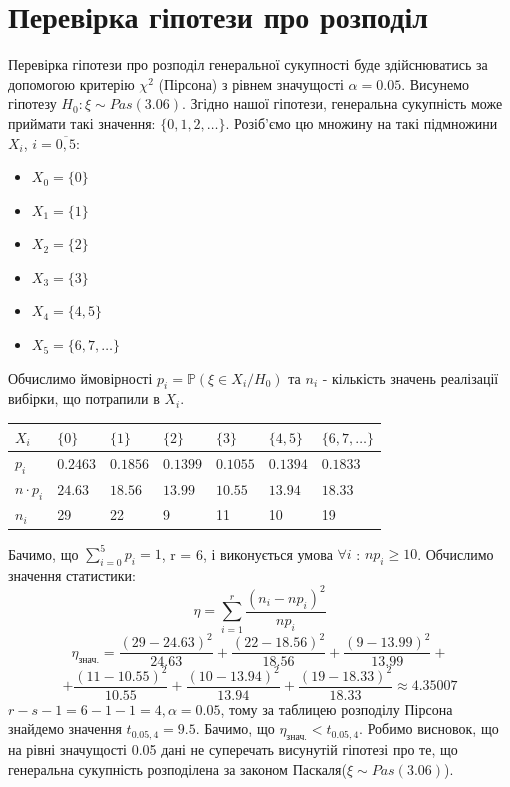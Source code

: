 \documentclass{article}
\begin{document}
\section{Перевірка гіпотези про розподіл}
Перевірка гіпотези про розподіл генеральної сукупності буде здійснюватись 
за допомогою критерію $\chi^2$ (Пірсона)  з рівнем значущості $\alpha = 0.05$.
\newline
Висунемо гіпотезу $H_0: \xi \sim Pas(3.06)$. Згідно нашої гіпотези, 
генеральна сукупність може приймати такі значення: $\{0, 1, 2, \dots\}$.
Розіб'ємо цю множину на такі підмножини $X_i$, $i = \overline{0,5}$:

\begin{multicols}{2}
  \begin{itemize}
    \item $X_0 = \{0\}$
    \item $X_1 = \{1\}$
    \item $X_2 = \{2\}$
    \item $X_3 = \{3\}$
    \item $X_4 = \{4, 5\}$
    \item $X_5 = \{6, 7, \dots\}$
  \end{itemize}
\end{multicols}
\newpage
Обчислимо ймовірності $p_i = \mathbb{P}(\xi \in X_i/H_0)$ та 
$n_i$ - кількість значень реалізації вибірки, що потрапили в 
$X_i$.
\newline
\begin{tabular}{|l|l|l|l|l|l|l|}
  \hline
  $X_i$ & $\{0\}$ & $\{1\}$ & $\{2\}$ & $\{3\}$ & $\{4, 5\}$ & 
  $\{6, 7, \dots\}$ \\
  \hline
  $p_i$ & $0.2463$ & $0.1856$ & $0.1399$ & $0.1055$ & 
  $0.1394$ & $0.1833$\\
  \hline
  $n\cdot p_i$ & $24.63$ & $18.56$ & $13.99$ & $10.55$ & 
  $13.94$ & $18.33$\\
  \hline
  $n_i$ & 29 & 22 & 9 & 11 & 10 & 19 \\
  \hline
\end{tabular}
\newline
\newline
Бачимо, що $\sum_{i = 0}^{5}p_i = 1$, r = 6, і виконується умова 
\newline
$\forall i$ : 
$np_i \geq 10$.
Обчислимо значення статистики:
$$\eta = \sum_{i=1}^r\frac{(n_i - np_i)^2}{np_i}$$
$$\eta_\text{знач.} = \frac{(29 - 24.63)^2}{24.63} + 
\frac{(22 - 18.56)^2}{18.56} + \frac{(9 - 13.99)^2}{13.99} + $$
$$+ \frac{(11 - 10.55)^2}{10.55} + \frac{(10 - 13.94)^2}{13.94} + 
\frac{(19 - 18.33)^2}{18.33} \approx 4.35007$$
$r - s - 1 = 6 - 1 - 1 = 4, \alpha = 0.05$, тому за таблицею розподілу 
Пірсона знайдемо значення $t_{0.05, 4} = 9.5$. Бачимо, що 
$\eta_\text{знач.} < t_{0.05, 4}$. Робимо висновок, що на рівні 
значущості 0.05 дані не суперечать висунутій гіпотезі про те, що 
генеральна сукупність розподілена за законом Паскаля($\xi 
\sim Pas(3.06)$).
\newpage
\end{document}
